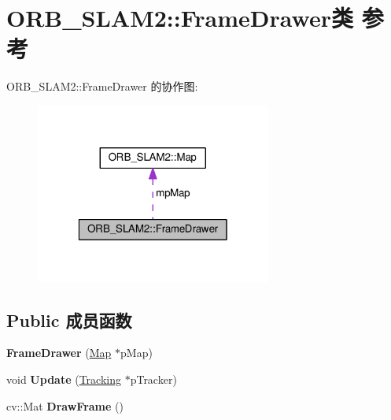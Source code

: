 \hypertarget{classORB__SLAM2_1_1FrameDrawer}{\section{O\-R\-B\-\_\-\-S\-L\-A\-M2\-:\-:Frame\-Drawer类 参考}
\label{classORB__SLAM2_1_1FrameDrawer}
}


O\-R\-B\-\_\-\-S\-L\-A\-M2\-:\-:Frame\-Drawer 的协作图\-:
\nopagebreak
\begin{figure}[H]
\begin{center}
\leavevmode
\includegraphics[width=220pt]{classORB__SLAM2_1_1FrameDrawer__coll__graph}
\end{center}
\end{figure}
\subsection*{Public 成员函数}
\begin{DoxyCompactItemize}
\item 
\hypertarget{classORB__SLAM2_1_1FrameDrawer_add0e1c3734c200a959d8ed9f225223db}{{\bfseries Frame\-Drawer} (\hyperlink{classORB__SLAM2_1_1Map}{Map} $\ast$p\-Map)}\label{classORB__SLAM2_1_1FrameDrawer_add0e1c3734c200a959d8ed9f225223db}

\item 
\hypertarget{classORB__SLAM2_1_1FrameDrawer_ad1bba97371be98ccab373bab862cf964}{void {\bfseries Update} (\hyperlink{classORB__SLAM2_1_1Tracking}{Tracking} $\ast$p\-Tracker)}\label{classORB__SLAM2_1_1FrameDrawer_ad1bba97371be98ccab373bab862cf964}

\item 
\hypertarget{classORB__SLAM2_1_1FrameDrawer_a7d2b0099c169f6944cadc2cd574a06de}{cv\-::\-Mat {\bfseries Draw\-Frame} ()}\label{classORB__SLAM2_1_1FrameDrawer_a7d2b0099c169f6944cadc2cd574a06de}

\end{DoxyCompactItemize}
